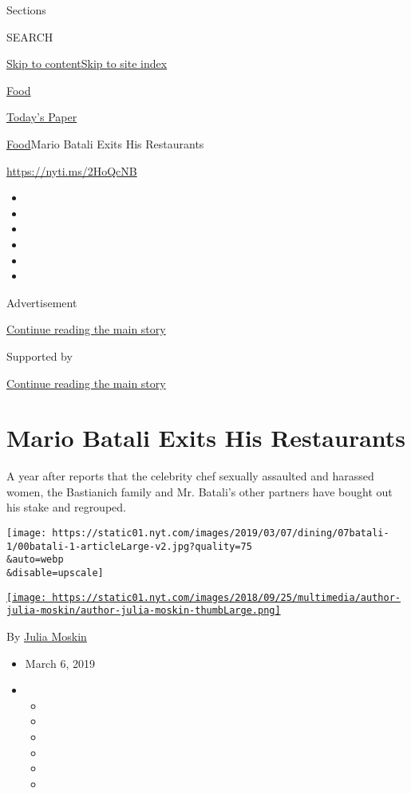 Sections

SEARCH

\protect\hyperlink{site-content}{Skip to
content}\protect\hyperlink{site-index}{Skip to site index}

\href{https://www.nytimes.com/section/food}{Food}

\href{https://myaccount.nytimes.com/auth/login?response_type=cookie\&client_id=vi}{}

\href{https://www.nytimes.com/section/todayspaper}{Today's Paper}

\href{/section/food}{Food}\textbar{}Mario Batali Exits His Restaurants

\url{https://nyti.ms/2HoQcNB}

\begin{itemize}
\item
\item
\item
\item
\item
\item
\end{itemize}

Advertisement

\protect\hyperlink{after-top}{Continue reading the main story}

Supported by

\protect\hyperlink{after-sponsor}{Continue reading the main story}

\hypertarget{mario-batali-exits-his-restaurants}{%
\section{Mario Batali Exits His
Restaurants}\label{mario-batali-exits-his-restaurants}}

A year after reports that the celebrity chef sexually assaulted and
harassed women, the Bastianich family and Mr. Batali's other partners
have bought out his stake and regrouped.

\texttt{[image: https://static01.nyt.com/images/2019/03/07/dining/07batali-1/00batali-1-articleLarge-v2.jpg?quality=75\\\&auto=webp\\\&disable=upscale]}

\href{https://www.nytimes.com/by/julia-moskin}{\texttt{[image: https://static01.nyt.com/images/2018/09/25/multimedia/author-julia-moskin/author-julia-moskin-thumbLarge.png]}}

By \href{https://www.nytimes.com/by/julia-moskin}{Julia Moskin}

\begin{itemize}
\item
  March 6, 2019
\item
  \begin{itemize}
  \item
  \item
  \item
  \item
  \item
  \item
  \end{itemize}
\end{itemize}

